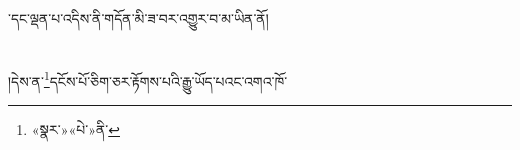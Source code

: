 ་དང་ལྡན་པ་འདིས་ནི་གདོན་མི་ཟ་བར་འགྱུར་བ་མ་ཡིན་ནོ།\chapter{ }།དེས་ན་\footnote{«སྣར་»«པེ་»ནི་}དངོས་པོ་ཅིག་ཅར་རྟོགས་པའི་རྒྱུ་ཡོད་པའང་འགའ་ཁོ་